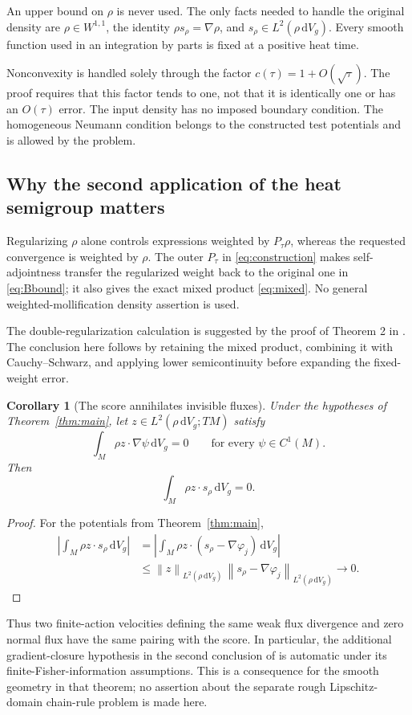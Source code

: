 \documentclass[11pt]{article}
\newtheorem{corollary}[theorem]{Corollary}
\newcommand{\dd}{\,\mathrm{d}}
\newcommand{\dV}{\dd V_g}
\newcommand{\normrho}[1]{\left\lVert #1\right\rVert_{L^2(\rho\,\mathrm{d}V_g)}}
\begin{document}
An upper bound on $\rho$ is never used. The only facts needed to handle the original density are $\rho\in W^{1,1}$, the identity $\rho s_\rho=\nabla\rho$, and $s_\rho\in L^2(\rho\,\mathrm{d}V_g)$. Every smooth function used in an integration by parts is fixed at a positive heat time.

Nonconvexity is handled solely through the factor $c(\tau)=1+O(\sqrt\tau)$. The proof requires that this factor tends to one, not that it is identically one or has an $O(\tau)$ error. The input density has no imposed boundary condition. The homogeneous Neumann condition belongs to the constructed test potentials and is allowed by the problem.

\subsection{Why the second application of the heat semigroup matters}
Regularizing $\rho$ alone controls expressions weighted by $P_\tau\rho$, whereas the requested convergence is weighted by $\rho$. The outer $P_\tau$ in \eqref{eq:construction} makes self-adjointness transfer the regularized weight back to the original one in \eqref{eq:Bbound}; it also gives the exact mixed product \eqref{eq:mixed}. No general weighted-mollification density assertion is used.

The double-regularization calculation is suggested by the proof of Theorem 2 in \cite{CFM}. The conclusion here follows by retaining the mixed product, combining it with Cauchy--Schwarz, and applying lower semicontinuity before expanding the fixed-weight error.

\begin{corollary}[The score annihilates invisible fluxes]\label{cor:flux}
Under the hypotheses of Theorem~\ref{thm:main}, let $z\in L^2(\rho\,\mathrm{d}V_g;TM)$ satisfy
\[
 \int_M\rho z\cdot\nabla\psi\dV=0
 \qquad\text{for every }\psi\in C^1(M).
\]
Then
\[
 \int_M\rho z\cdot s_\rho\dV=0.
\]
\end{corollary}
\begin{proof}
For the potentials from Theorem~\ref{thm:main},
\begin{align*}
 \left|\int_M\rho z\cdot s_\rho\dV\right|
 &=\left|\int_M\rho z\cdot(s_\rho-\nabla\varphi_j)\dV\right|\\
 &\leq\normrho{z}\,\normrho{s_\rho-\nabla\varphi_j}
 \longrightarrow0.
\end{align*}
\end{proof}
Thus two finite-action velocities defining the same weak flux divergence and zero normal flux have the same pairing with the score. In particular, the additional gradient-closure hypothesis in the second conclusion of \cite[Theorem 4]{CFM} is automatic under its finite-Fisher-information assumptions. This is a consequence for the smooth geometry in that theorem; no assertion about the separate rough Lipschitz-domain chain-rule problem is made here.
\end{document}
